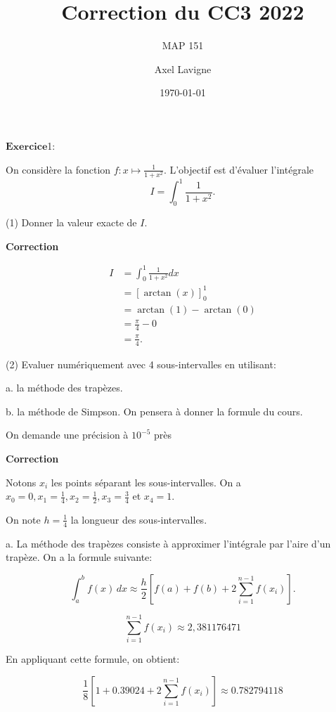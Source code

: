 \documentclass{article}
\title{Correction du CC3 2022}
\subtitle{MAP 151}
\author{Axel Lavigne}
\date{\today}
\newcommand{\correction}[0]{
    \vspace{1mm}
    \textbf{Correction}
    \hrulefill
}
\begin{document}
\maketitle


$\mathbf{Exercice}$1:

On considère la fonction $f:x\mapsto\frac1{1+x^2}.$ L'objectif est d'évaluer l'intégrale
$$I=\int_0^1\frac{1}{1+x^2}.$$


(1) Donner la valeur exacte de $I.$

\correction

\begin{align*}
    I &= \int_0^1\frac{1}{1+x^2}dx \\
    &= \left[ \arctan(x) \right]_0^1 \\
    &= \arctan(1) - \arctan(0) \\
    &= \frac{\pi}{4} - 0 \\
    &= \frac{\pi}{4}.
\end{align*}


\hrulefill


(2) Evaluer numériquement avec 4 sous-intervalles en utilisant:


a. la méthode des trapèzes. 

b. la méthode de Simpson. On pensera à donner la formule du cours.

On demande une précision à $10^{-5}$ près


\correction

Notons $x_i$ les points séparant les sous-intervalles. 
On a $x_0=0, x_1=\frac14, x_2=\frac12, x_3=\frac34$ et $x_4=1.$

On note $h=\frac14$ la longueur des sous-intervalles.

a. La méthode des trapèzes consiste à approximer l'intégrale par l'aire d'un trapèze.
On a la formule suivante:

\begin{equation*}
    \int_a^b f(x) \, dx \approx \frac{h}{2} \left[ f(a) + f(b) + 2 \sum_{i=1}^{n-1} f(x_i) \right].
\end{equation*}

\begin{equation*}
    \sum_{i=1}^{n-1} f(x_i) \approx 2,381176471
\end{equation*}

En appliquant cette formule, on obtient:

\begin{equation*}
    \frac18 \left[ 1 + 0.39024 + 2 \sum_{i=1}^{n-1} f(x_i) \right] \approx 0.782794118
\end{equation*}
\end{document}
